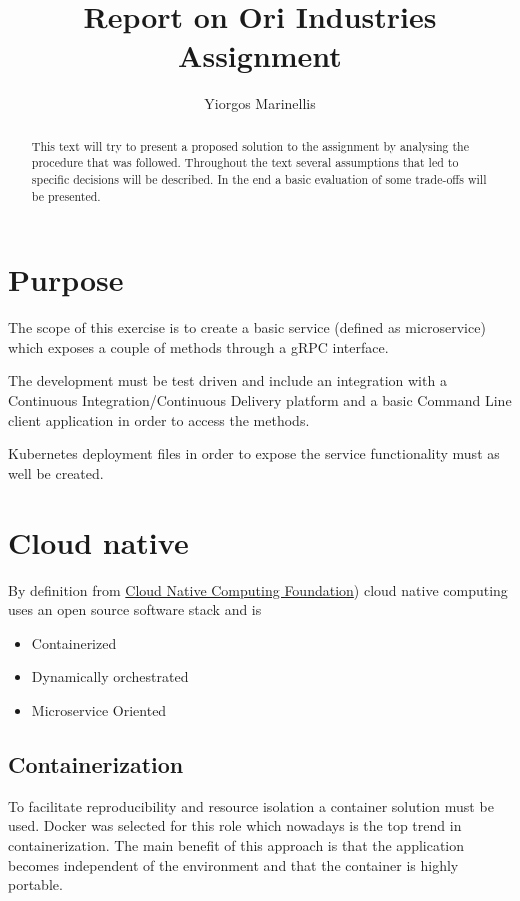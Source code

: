 \documentclass[a4paper,10pt]{article}
\title{Report on Ori Industries Assignment}
\author{Yiorgos Marinellis}
\begin{document}
\maketitle

\begin{abstract}
This text will try to present a proposed solution to the assignment
by analysing the procedure that was followed. Throughout the text
several assumptions that led to specific decisions will be described.
In the end a basic evaluation of some trade-offs will be presented.
\end{abstract}

\section{Purpose}
The scope of this exercise is to create a basic service (defined as microservice) 
which exposes a couple of methods through a gRPC interface. 

The development must be test driven and include an integration with a Continuous Integration/Continuous Delivery platform and a basic Command Line client application 
in order to access the methods.

Kubernetes deployment files in order to expose the service functionality must as well 
be created.


\section{Cloud native}
By definition from \href{https://github.com/cncf/toc/blob/master/DEFINITION.md}{Cloud Native Computing Foundation}) cloud native computing uses an open source software 
stack and is 
\begin{itemize}
    \item Containerized
    \item Dynamically orchestrated
    \item Microservice Oriented
\end{itemize}

\subsection{Containerization}
To facilitate reproducibility and resource isolation a container solution must be used.
Docker was selected for this role which nowadays is the top trend in containerization. 
The main benefit of this approach is that the application becomes independent of the environment and that the container is highly portable.
\end{document}

